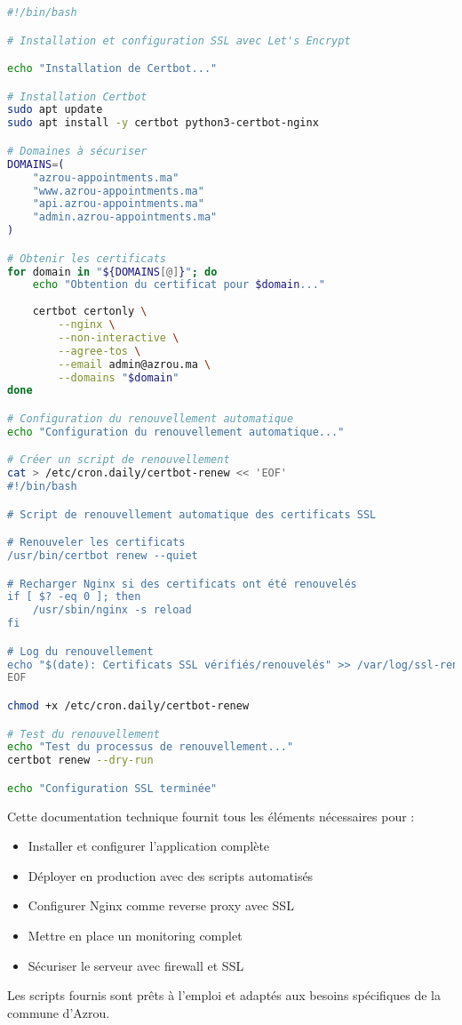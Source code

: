 \begin{lstlisting}[language=bash, caption=ssl-setup.sh - Configuration SSL automatique]
#!/bin/bash

# Installation et configuration SSL avec Let's Encrypt

echo "Installation de Certbot..."

# Installation Certbot
sudo apt update
sudo apt install -y certbot python3-certbot-nginx

# Domaines à sécuriser
DOMAINS=(
    "azrou-appointments.ma"
    "www.azrou-appointments.ma"
    "api.azrou-appointments.ma"
    "admin.azrou-appointments.ma"
)

# Obtenir les certificats
for domain in "${DOMAINS[@]}"; do
    echo "Obtention du certificat pour $domain..."
    
    certbot certonly \
        --nginx \
        --non-interactive \
        --agree-tos \
        --email admin@azrou.ma \
        --domains "$domain"
done

# Configuration du renouvellement automatique
echo "Configuration du renouvellement automatique..."

# Créer un script de renouvellement
cat > /etc/cron.daily/certbot-renew << 'EOF'
#!/bin/bash

# Script de renouvellement automatique des certificats SSL

# Renouveler les certificats
/usr/bin/certbot renew --quiet

# Recharger Nginx si des certificats ont été renouvelés
if [ $? -eq 0 ]; then
    /usr/sbin/nginx -s reload
fi

# Log du renouvellement
echo "$(date): Certificats SSL vérifiés/renouvelés" >> /var/log/ssl-renewal.log
EOF

chmod +x /etc/cron.daily/certbot-renew

# Test du renouvellement
echo "Test du processus de renouvellement..."
certbot renew --dry-run

echo "Configuration SSL terminée"
\end{lstlisting}

Cette documentation technique fournit tous les éléments nécessaires pour :

\begin{itemize}
    \item Installer et configurer l'application complète
    \item Déployer en production avec des scripts automatisés
    \item Configurer Nginx comme reverse proxy avec SSL
    \item Mettre en place un monitoring complet
    \item Sécuriser le serveur avec firewall et SSL
\end{itemize}

Les scripts fournis sont prêts à l'emploi et adaptés aux besoins spécifiques de la commune d'Azrou.
